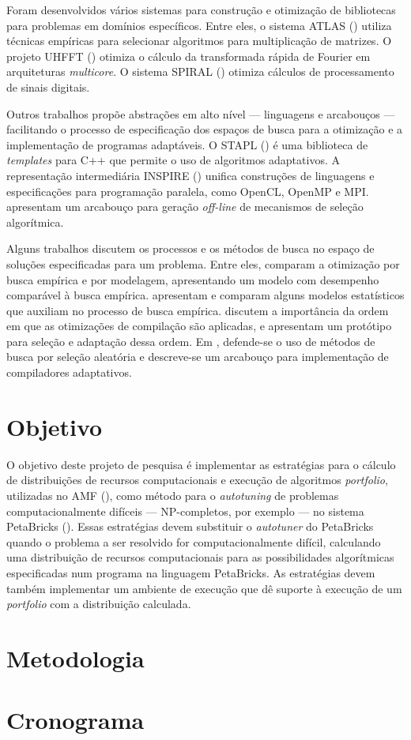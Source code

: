 \documentclass[a4paper, 11pt]{article}
\begin{document}
Foram desenvolvidos vários sistemas para construção e otimização de bibliotecas
para problemas em domínios específicos. Entre eles, o sistema ATLAS 
(\citet{whaley1998, whaley2005}) utiliza técnicas empíricas para selecionar
algoritmos para multiplicação de matrizes. O projeto UHFFT 
(\citet{ali2007scheduling}) otimiza o cálculo da transformada rápida
de Fourier em arquiteturas \emph{multicore}. O sistema SPIRAL 
(\citet{puschel2005spiral}) otimiza cálculos de processamento de sinais
digitais.

Outros trabalhos propõe abstrações em alto nível --- linguagens e arcabouços 
--- facilitando o processo de especificação dos espaços de busca para a 
otimização e a implementação de programas adaptáveis. O STAPL 
(\citet{thomas2005stapl}) é uma biblioteca de \emph{templates} para C++
que permite o uso de algoritmos adaptativos. A representação intermediária
INSPIRE (\citet{jordan2013inspire}) unifica construções de linguagens e 
especificações para programação paralela, como OpenCL, OpenMP e MPI.
\citet{yu2004adaptive} apresentam um arcabouço para geração \emph{off-line}
de mecanismos de seleção algorítmica.

Alguns trabalhos discutem os processos e os métodos de busca no espaço
de soluções especificadas para um problema. Entre eles,
\citet{yotov2003} comparam a otimização por busca empírica e por 
modelagem, apresentando um modelo com desempenho comparável à busca empírica.
\citet{vuduc2004} apresentam e comparam alguns
modelos estatísticos que auxiliam no processo de busca empírica.
\citet{cooper2002compilation} discutem a importância da
ordem em que as otimizações de compilação são aplicadas, e apresentam
um protótipo para seleção e adaptação dessa ordem.
Em \citet{cooper2002adaptive}, defende-se o uso de métodos de busca
por seleção aleatória e descreve-se um arcabouço para implementação
de compiladores adaptativos.

\section{Objetivo} \label{sec:obj}

O objetivo deste projeto de pesquisa é implementar as estratégias para o 
cálculo de distribuições de recursos computacionais e execução de algoritmos 
\emph{portfolio}, utilizadas no AMF (\citet{goldman2012framework}), como método
para o \emph{autotuning} de problemas computacionalmente difíceis --- 
NP-completos, por exemplo --- no sistema PetaBricks (\citet{ansel2014phd}).
Essas estratégias devem substituir o \emph{autotuner} do PetaBricks quando o 
problema a ser resolvido for computacionalmente difícil, calculando uma
distribuição de recursos computacionais para as possibilidades algorítmicas 
especificadas num programa na linguagem PetaBricks. As estratégias devem também
implementar um ambiente de execução que dê suporte à execução de um 
\emph{portfolio} com a distribuição calculada.

\section{Metodologia} \label{sec:met}

\section{Cronograma} \label{sec:chrono}

\newpage


\end{document}
